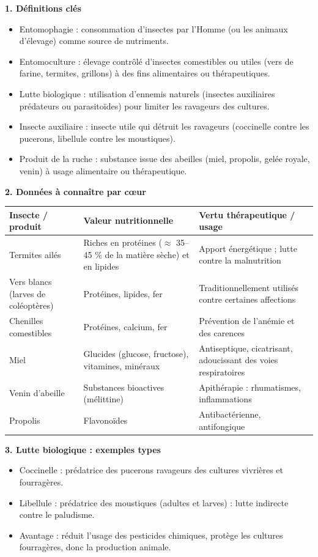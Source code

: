 \documentclass[11pt]{article}
\newcommand{\cle}[1]{{\popxbold\color{popdark}#1}}
\begin{document}
\begin{bilan}
\textbf{1. Définitions clés}
\begin{itemize}
  \item \cle{Entomophagie} : consommation d'insectes par l'Homme (ou les animaux d'élevage) comme source de nutriments.
  \item \cle{Entomoculture} : élevage contrôlé d'insectes comestibles ou utiles (vers de farine, termites, grillons) à des fins alimentaires ou thérapeutiques.
  \item \cle{Lutte biologique} : utilisation d'ennemis naturels (insectes auxiliaires prédateurs ou parasitoïdes) pour limiter les ravageurs des cultures.
  \item \cle{Insecte auxiliaire} : insecte utile qui détruit les ravageurs (coccinelle contre les pucerons, libellule contre les moustiques).
  \item \cle{Produit de la ruche} : substance issue des abeilles (miel, propolis, gelée royale, venin) à usage alimentaire ou thérapeutique.
\end{itemize}

\textbf{2. Données à connaître par c\oe ur}
\begin{center}
\begin{tabularx}{\linewidth}{|l|X|X|}
\hline
\rowcolor{popblueL} \textbf{Insecte / produit} & \textbf{Valeur nutritionnelle} & \textbf{Vertu thérapeutique / usage} \\
\hline
Termites ailés & Riches en protéines ($\approx$ 35--45 \% de la matière sèche) et en lipides & Apport énergétique ; lutte contre la malnutrition \\
\hline
Vers blancs (larves de coléoptères) & Protéines, lipides, fer & Traditionnellement utilisés contre certaines affections \\
\hline
Chenilles comestibles & Protéines, calcium, fer & Prévention de l'anémie et des carences \\
\hline
Miel & Glucides (glucose, fructose), vitamines, minéraux & Antiseptique, cicatrisant, adoucissant des voies respiratoires \\
\hline
Venin d'abeille & Substances bioactives (mélittine) & Apithérapie : rhumatismes, inflammations \\
\hline
Propolis & Flavonoïdes & Antibactérienne, antifongique \\
\hline
\end{tabularx}
\end{center}

\textbf{3. Lutte biologique : exemples types}
\begin{itemize}
  \item \cle{Coccinelle} : prédatrice des pucerons ravageurs des cultures vivrières et fourragères.
  \item \cle{Libellule} : prédatrice des moustiques (adultes et larves) : lutte indirecte contre le paludisme.
  \item Avantage : réduit l'usage des pesticides chimiques, protège les cultures fourragères, donc la production animale.
\end{itemize}


\end{bilan}
\end{document}
